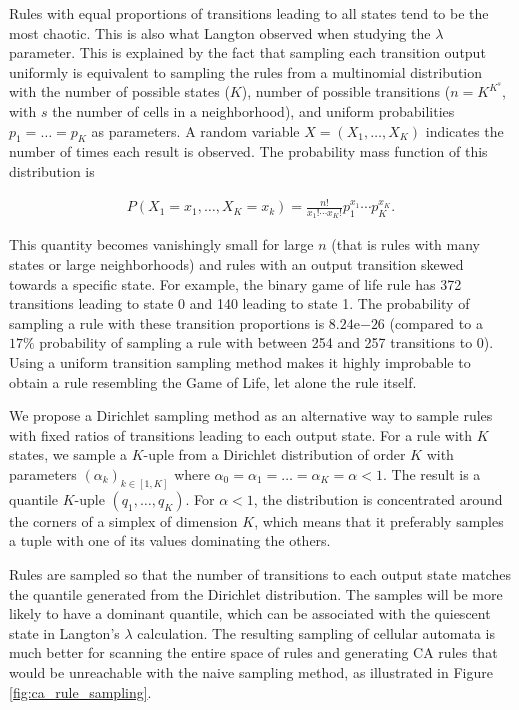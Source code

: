 Rules with equal proportions of transitions leading to all states tend to be the
most chaotic. This is also what Langton observed when studying the $\lambda$
parameter. This is explained by the fact that sampling each transition output
uniformly is equivalent to sampling the rules from a multinomial distribution
with the number of possible states ($K$), number of possible transitions
($n = K^{K^{s}}$, with $s$ the number of cells in a neighborhood), and uniform
probabilities $p_{1}= \ldots= p_{K}$ as parameters. A random variable
$X = (X_{1}, \ldots, X_{K})$ indicates the number of times each result is observed.
The probability mass function of this distribution is

\begin{equation}
  \label{eq:multinomial}
  \begin{aligned}
    P(X_{1}=x_{1}, \ldots , X_{K}=x_{k}) = \frac{n!}{x_{1}!\cdots x_{K}!} p_{1}^{x_{1}}\cdots p_{K}^{x_{K}}.
  \end{aligned}
\end{equation}

This quantity becomes vanishingly small for large $n$ (that is rules with many
states or large neighborhoods) and rules with an output transition skewed
towards a specific state. For example, the binary game of life rule has 372
transitions leading to state 0 and 140 leading to state 1. The probability
of sampling a rule with these transition proportions is $8.24\mathrm{e}{-26}$
(compared to a $17\%$ probability of sampling a rule with between 254 and 257
transitions to 0). Using a uniform transition sampling method makes it highly 
improbable to obtain a rule resembling the Game of Life, let alone the rule itself.

We propose a Dirichlet sampling method as an alternative way to sample rules
with fixed ratios of transitions leading to each output state. For a rule with
$K$ states, we sample a $K$-uple from a Dirichlet distribution of order $K$ with
parameters $(\alpha_{k})_{k\in [1, K]}$ where $\alpha_{0} = \alpha_{1} = \ldots = \alpha_{K} = \alpha < 1$. The
result is a quantile $K$-uple $(q_{1}, \ldots, q_{K})$. For $\alpha < 1$, the distribution
is concentrated around the corners of a simplex of dimension $K$, which means
that it preferably samples a tuple with one of its values dominating the others.

Rules are sampled so that the number of transitions to each output state matches
the quantile generated from the Dirichlet distribution. The samples will be more
likely to have a dominant quantile, which can be associated with the quiescent
state in Langton's $\lambda$ calculation. The resulting sampling of cellular automata
is much better for scanning the entire space of rules and generating \ac{CA}
rules that would be unreachable with the naive sampling method, as illustrated
in Figure \ref{fig:ca_rule_sampling}.

